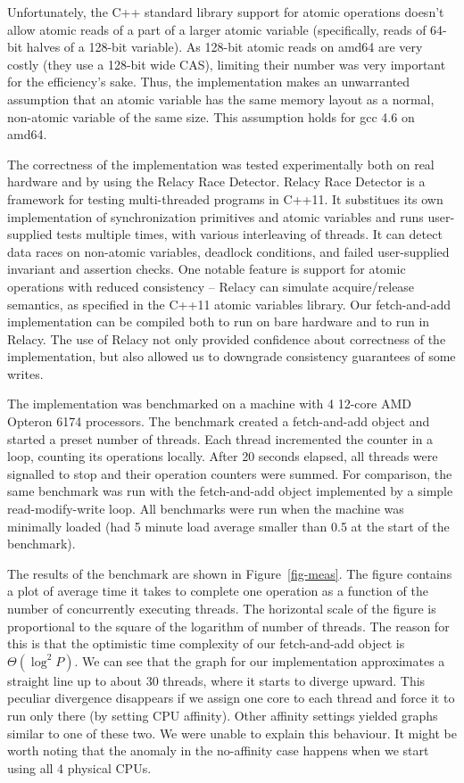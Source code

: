 \documentclass[a4paper,11pt]{article}
\begin{document}
Unfortunately, the C++ standard library support for atomic operations doesn't allow atomic reads of a part of a larger atomic variable (specifically, reads of 64-bit halves of a 128-bit variable).
As 128-bit atomic reads on amd64 are very costly
(they use a 128-bit wide CAS), limiting their number was very important for the efficiency's sake. Thus, the implementation makes an unwarranted assumption that an atomic variable
has the same memory layout as a normal, non-atomic variable of the same size. This assumption holds for gcc 4.6 on amd64.

The correctness of the implementation was tested experimentally both on real hardware and by using the Relacy Race Detector\cite{rrd}. Relacy Race Detector is a framework for testing multi-threaded programs in C++11.
It substitues its own
implementation of synchronization primitives and atomic variables and runs user-supplied tests multiple times, with various interleaving of threads.
It can detect data races on non-atomic variables, deadlock conditions, and failed user-supplied invariant and assertion
checks. One notable feature is support for atomic operations with reduced consistency -- Relacy can simulate acquire/release semantics, as specified in the C++11 atomic variables library.
Our fetch-and-add implementation can be compiled both to run on bare hardware and to run in Relacy. The use of Relacy not only provided confidence about correctness of the implementation, but also allowed us to downgrade
consistency guarantees of some writes.


The implementation was benchmarked on a machine with 4 12-core AMD Opteron 6174 processors.
The benchmark created a fetch-and-add object and started a preset number of threads. Each thread incremented the counter in a loop, counting its operations locally. After 20 seconds elapsed, all threads were signalled
to stop and their operation counters were summed. For comparison, the same benchmark was run with the fetch-and-add object implemented by a simple read-modify-write loop. All benchmarks were run when the machine was
minimally loaded (had 5 minute load average smaller than 0.5 at the start of the benchmark).

The results of the benchmark are shown in Figure~\ref{fig-meas}. The figure contains a plot of average time it takes to complete one operation as a function of the number of concurrently executing threads. 
The horizontal scale of the figure is proportional to the square of the logarithm of number of threads. The reason for this is that the optimistic time complexity
of our fetch-and-add object is $\Theta(\log^2 P)$. We can see that the graph for our implementation approximates a straight line up to about 30 threads, where it starts to diverge upward. This peculiar divergence disappears
if we assign one core to each thread and force it to run only there (by setting CPU affinity). Other affinity settings yielded graphs similar to one of these two. We were unable to explain this behaviour. It might
be worth noting that the anomaly in the no-affinity case happens when we start using all 4 physical CPUs.
\end{document}

